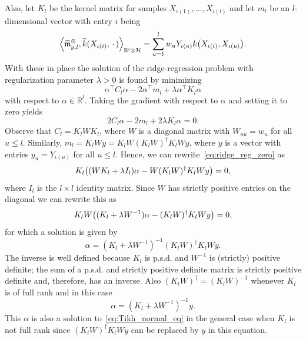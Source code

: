 \documentclass[10pt]{amsart}
\theoremstyle{definition}\newtheorem{defi}[theo]{Definition}\newtheorem{rema}[theo]{Remark}\newtheorem{exam}[theo]{Example}\newtheorem{exem}[theo]{Example}\newtheorem{nota}[theo]{Notation}
\theoremstyle{remark}
\newcommand{\R}{\mathbb{R}}
\newcommand{\dR}{{\R'}}
\newcommand{\cH}{\mathcal{H}}
\newcommand{\mean}{\mathfrak{m}}
\let\oldhat\hat
\renewcommand*{\hat}[1]{\mathchoice{\widehat{#1}}{\widehat{#1}}{\oldhat{#1}}{\oldhat{#1}}}
\let\originalleft\left
\let\originalright\right
\renewcommand{\left}{\mathopen{}\mathclose\bgroup\originalleft}
\renewcommand{\right}{\aftergroup\egroup\originalright}
\begin{document}
Also, let $K_l$ be the kernel matrix for samples $X_{\iota(1)},\dots, X_{\iota(l)}$ and let $m_l$ be an $l$-dimensional vector with entry $i$ being
\[
\left\langle \hat \mean^\otimes_{y,l}, \hat k(X_{\iota(i)},\,\cdot\,) \right\rangle_{\dR \otimes \cH} = \sum_{u=1}^l w_u Y_{\iota(u)} k\left(X_{\iota(i)}, X_{\iota(u)}\right).
\]
With these in place the solution of the ridge-regression problem with regularization parameter $\lambda >0$ is found by minimizing
\[
\alpha^\top C_l \alpha - 2 \alpha^\top m_l + \lambda \alpha^\top K_l \alpha
\]
with respect to $\alpha \in \R^l$. Taking the gradient with respect to $\alpha$ and setting it to zero yields
\begin{equation}\label{eq:ridge_reg_zero}
2 C_l \alpha - 2 m_l + 2 \lambda K_l \alpha = 0.
\end{equation}
Observe that $C_l = K_l W K_l$, where $W$ is a diagonal matrix with $W_{uu} =w_u$ for all $u\leq l$. Similarly, $m_l = K_l W y = K_l W (K_l W)^\dagger K_l W y$, where $y$ is a vector with entries $y_u = Y_{\iota(u)}$ for all $u\leq l$. Hence, we can rewrite~\eqref{eq:ridge_reg_zero} as
\[
K_l \left((WK_l + \lambda I_l) \alpha - W (K_l W)^\dagger K_l W y\right)=0,
\]
where $I_l$ is the $l\times l$ identity matrix. Since $W$ has strictly positive entries on the diagonal we can rewrite this as
\begin{equation}\label{eq:Tikh_normal_eq}
K_lW \left((K_l + \lambda W^{-1}) \alpha - (K_l W)^\dagger K_l W y\right)=0,
\end{equation}
for which a solution is given by
\begin{equation}\label{eq:Tikh_minimal}
\alpha = (K_l + \lambda W^{-1})^{-1} (K_l W)^\dagger K_l Wy.
\end{equation}
The inverse is well defined because $K_l$ is p.s.d. and $W^{-1}$ is (strictly) positive definite; the sum of a p.s.d. and strictly positive definite matrix is strictly positive definite and, therefore, has an inverse. Also $(K_l W)^\dagger = (K_l W)^{-1}$ whenever $K_l$ is of full rank and in this case
\begin{equation}\label{eq:Tikh_suboptimal}
\alpha = (K_l + \lambda W^{-1})^{-1} y.
\end{equation}
This $\alpha$ is also a solution to~\eqref{eq:Tikh_normal_eq} in the general case when $K_l$ is not full rank since $(K_l W)^\dagger K_l W y$ can be replaced by $y$ in this equation.
\end{document}
